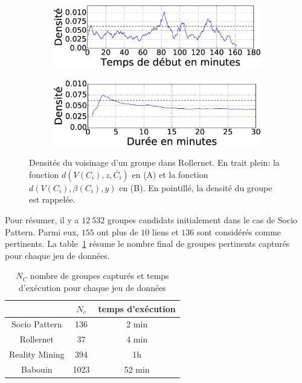\begin{figure}
\centering
\begin{subfigure}{0.45\linewidth}
	\includegraphics[width=\linewidth]{img/GroupeDense/GroupExample/Rollernet/vairable_start7}
	\caption{}
	\label{fig:g7_debut}
\end{subfigure}
\begin{subfigure}{0.45\linewidth}
	\includegraphics[width=\linewidth]{img/GroupeDense/GroupExample/Rollernet/vairable_duration7}
	\caption{}
	\label{fig:g7_duree}
\end{subfigure}
\caption{
Densités du voisinage d'un groupe dans Rollernet.
En trait plein: la fonction $d(V(C_i),z,\bar{C_i})$ en (A) et la fonction  $d(V(C_i),\beta(C_i),y)$ en (B).
En pointillé, la densité du groupe est rappelée.
}
\label{fig:Rollernet_exemple}
\end{figure}





\bigskip
Pour résumer, il y a $12\ 532$  groupes candidats initialement dans le cas de Socio Pattern.
Parmi eux, $155$ ont plus de $10$ liens et $136$ sont considérés comme pertinents.
La table~\ref{tab:res_exec} résume le nombre final de groupes pertinents capturés pour chaque jeu de données.


\begin{table}
\centering
\begin{tabular}{|c|c|c|}
\hline \rule[-1ex]{0pt}{3.5ex}
 & $N_c$ & temps d'exécution \\
\hline
Socio Pattern & 136 &  2 min \\
Rollernet& 37 &  4 min \\
Reality Mining & 394 & 1h \\
Babouin & 1023 & 52 min\\
\hline
\end{tabular}
\caption{$N_C$ nombre de groupes capturés et temps d'exécution pour chaque jeu de données}
\label{tab:res_exec}       %
\end{table}


